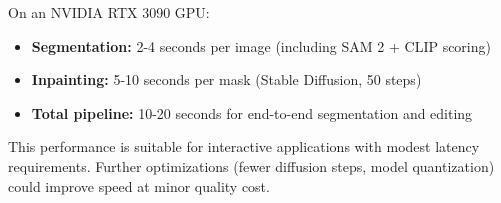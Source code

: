 On an NVIDIA RTX 3090 GPU:
\begin{itemize}
    \item \textbf{Segmentation:} 2-4 seconds per image (including SAM 2 + CLIP scoring)
    \item \textbf{Inpainting:} 5-10 seconds per mask (Stable Diffusion, 50 steps)
    \item \textbf{Total pipeline:} 10-20 seconds for end-to-end segmentation and editing
\end{itemize}

This performance is suitable for interactive applications with modest latency requirements. Further optimizations (fewer diffusion steps, model quantization) could improve speed at minor quality cost.
